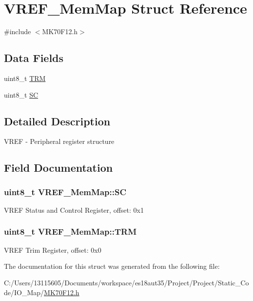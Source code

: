 \hypertarget{struct_v_r_e_f___mem_map}{}\section{V\+R\+E\+F\+\_\+\+Mem\+Map Struct Reference}
\label{struct_v_r_e_f___mem_map}


{\ttfamily \#include $<$M\+K70\+F12.\+h$>$}

\subsection*{Data Fields}
\begin{DoxyCompactItemize}
\item 
uint8\+\_\+t \hyperlink{struct_v_r_e_f___mem_map_a987ecd280eb0b25ff58841b304de2e1f}{T\+R\+M}
\item 
uint8\+\_\+t \hyperlink{struct_v_r_e_f___mem_map_a5d8e7e9026a69a14ff0d0b3caee5cf24}{S\+C}
\end{DoxyCompactItemize}


\subsection{Detailed Description}
V\+R\+E\+F -\/ Peripheral register structure 

\subsection{Field Documentation}
\hypertarget{struct_v_r_e_f___mem_map_a5d8e7e9026a69a14ff0d0b3caee5cf24}{}
\subsubsection[{S\+C}]{\setlength{\rightskip}{0pt plus 5cm}uint8\+\_\+t V\+R\+E\+F\+\_\+\+Mem\+Map\+::\+S\+C}\label{struct_v_r_e_f___mem_map_a5d8e7e9026a69a14ff0d0b3caee5cf24}
V\+R\+E\+F Status and Control Register, offset\+: 0x1 \hypertarget{struct_v_r_e_f___mem_map_a987ecd280eb0b25ff58841b304de2e1f}{}
\subsubsection[{T\+R\+M}]{\setlength{\rightskip}{0pt plus 5cm}uint8\+\_\+t V\+R\+E\+F\+\_\+\+Mem\+Map\+::\+T\+R\+M}\label{struct_v_r_e_f___mem_map_a987ecd280eb0b25ff58841b304de2e1f}
V\+R\+E\+F Trim Register, offset\+: 0x0 

The documentation for this struct was generated from the following file\+:\begin{DoxyCompactItemize}
\item 
C\+:/\+Users/13115605/\+Documents/workspace/es18aut35/\+Project/\+Project/\+Static\+\_\+\+Code/\+I\+O\+\_\+\+Map/\hyperlink{_m_k70_f12_8h}{M\+K70\+F12.\+h}\end{DoxyCompactItemize}
